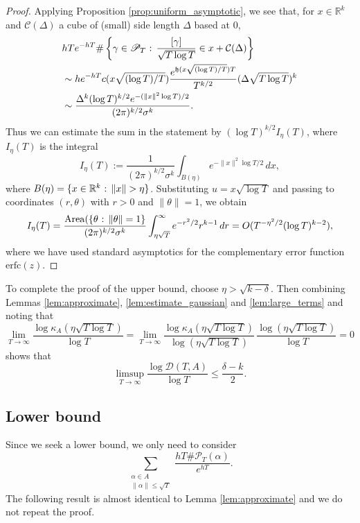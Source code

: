 \documentclass[11pt]{amsart}
\theoremstyle{definition}
\numberwithin{equation}{section}
\numberwithin{theorem}{section}
\def\R{\mathbb{R}}
\begin{document}
\begin{proof}
Applying Proposition \ref{prop:uniform_asymptotic}, we see that, for $x \in \R^k$
and $\mathcal C(\Delta)$ a cube of (small) side length $\Delta$ based at $0$,
\begin{align*}
&hTe^{-hT} \#\left\{\gamma \in \mathscr P_T \hbox{ : }
\frac{[\gamma]}{ \sqrt{T\log T}} \in x+\mathcal C(\Delta)\right\}
\\
&\sim
he^{-hT} c(x \sqrt{(\log T)/T})
\frac{e^{\mathfrak h(x \sqrt{(\log T)/T})T}}{T^{k/2}} (\Delta \sqrt{T \log T})^k
\\
&\sim \frac{\Delta^k (\log T)^{k/2} e^{-(\|x\|^2  \log T)/2}}{(2\pi)^{k/2} \sigma^k}.
\end{align*}
Thus we can estimate the sum in the statement by $(\log T)^{k/2}I_\eta(T)$,
where $I_\eta(T)$ is the integral
\[
I_\eta(T) :=\frac{1}{(2\pi)^{k/2}\sigma^k} \int_{B(\eta)} e^{-\|x\|^2  \log T/2} \, dx,
\]
where $B(\eta) = \{x \in \R^k \hbox{ : } \|x\|>\eta\}$.
Substituting $u = x\sqrt{\log T}$ and passing to coordinates $(r,\theta)$ with $r>0$ and
$\|\theta\|=1$, we obtain
\[
I_\eta(T) = \frac{\mathrm{Area}(\{\theta \hbox{ : } \|\theta\|=1\}}{(2\pi)^{k/2}\sigma^k} 
\int_{\eta\sqrt{T}}^\infty e^{-r^2/2} r^{k-1} \, dr
=O(T^{-\eta^2/2} (\log T)^{k-2}),
\]
where we have used standard asymptotics for the complementary error function $\mathrm{erfc}(z)$.
\end{proof}

To complete the proof of the upper bound, choose $\eta >\sqrt{k-\delta}$. 
Then combining Lemmas \ref{lem:approximate}, \ref{lem:estimate_gaussian} and
\ref{lem:large_terms} and noting that
\[
\lim_{T \to \infty} \frac{\log \kappa_A(\eta \sqrt{T \log T})}{\log T} =
\lim_{T \to \infty} \frac{\log \kappa_A(\eta\sqrt{T\log T})}{\log(\eta \sqrt{T\log T})}
\, \frac{\log (\eta \sqrt{T\log T})}{\log T} =0
\]
shows that
\begin{equation}\label{eqn:upper_bound}
\limsup_{T \to \infty} \frac{\log \mathscr D(T,A)}{\log T} \le \frac{\delta-k}{2}.
\end{equation}

\subsection{Lower bound}

Since we seek a lower bound, we only need to consider
\[
\sum_{\substack{\alpha \in A \\ \|\alpha\| \le \sqrt{T}}}
\frac{hT\#\mathscr P_T(\alpha)}{e^{hT}}.
\]
The following result is almost identical to Lemma \ref{lem:approximate} and we do not 
repeat the proof.
\end{document}
